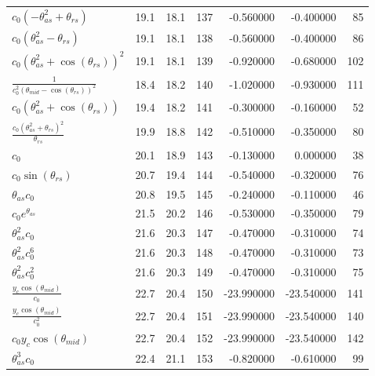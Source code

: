 \begin{tabularx}{\textwidth}{lllrrrr}
$ c_{0} \left(- \theta_{as}^{2} + \theta_{rs}\right) $  &  19.1  &  18.1  &  137  &  -0.560000  &  -0.400000  &  85  \\ 
$ c_{0} \left(\theta_{as}^{2} - \theta_{rs}\right) $  &  19.1  &  18.1  &  138  &  -0.560000  &  -0.400000  &  86  \\ 
$ c_{0} \left(\theta_{as}^{2} + \cos{\left(\theta_{rs} \right)}\right)^{2} $  &  19.1  &  18.1  &  139  &  -0.920000  &  -0.680000  &  102  \\ 
$ \displaystyle\frac{1}{c_{0}^{2} \left(\theta_{mid} - \cos{\left(\theta_{rs} \right)}\right)^{2}} $  &  18.4  &  18.2  &  140  &  -1.020000  &  -0.930000  &  111  \\ 
$ c_{0} \left(\theta_{as}^{2} + \cos{\left(\theta_{rs} \right)}\right) $  &  19.4  &  18.2  &  141  &  -0.300000  &  -0.160000  &  52  \\ 
$ \displaystyle\frac{c_{0} \left(\theta_{as}^{2} + \theta_{rs}\right)^{2}}{\theta_{rs}} $  &  19.9  &  18.8  &  142  &  -0.510000  &  -0.350000  &  80  \\ 
$ c_{0} $  &  20.1  &  18.9  &  143  &  -0.130000  &  0.000000  &  38  \\ 
$ c_{0} \sin{\left(\theta_{rs} \right)} $  &  20.7  &  19.4  &  144  &  -0.540000  &  -0.320000  &  76  \\ 
$ \theta_{as} c_{0} $  &  20.8  &  19.5  &  145  &  -0.240000  &  -0.110000  &  46  \\ 
$ c_{0} e^{\theta_{as}} $  &  21.5  &  20.2  &  146  &  -0.530000  &  -0.350000  &  79  \\ 
$ \theta_{as}^{2} c_{0} $  &  21.6  &  20.3  &  147  &  -0.470000  &  -0.310000  &  74  \\ 
$ \theta_{as}^{2} c_{0}^{6} $  &  21.6  &  20.3  &  148  &  -0.470000  &  -0.310000  &  73  \\ 
$ \theta_{as}^{2} c_{0}^{2} $  &  21.6  &  20.3  &  149  &  -0.470000  &  -0.310000  &  75  \\ 
$ \displaystyle\frac{y_c \cos{\left(\theta_{mid} \right)}}{c_{0}} $  &  22.7  &  20.4  &  150  &  -23.990000  &  -23.540000  &  141  \\ 
$ \displaystyle\frac{y_c \cos{\left(\theta_{mid} \right)}}{c_{0}^{2}} $  &  22.7  &  20.4  &  151  &  -23.990000  &  -23.540000  &  140  \\ 
$ c_{0} y_c \cos{\left(\theta_{mid} \right)} $  &  22.7  &  20.4  &  152  &  -23.990000  &  -23.540000  &  142  \\ 
$ \theta_{as}^{3} c_{0} $  &  22.4  &  21.1  &  153  &  -0.820000  &  -0.610000  &  99  \\ 

\end{tabularx}
